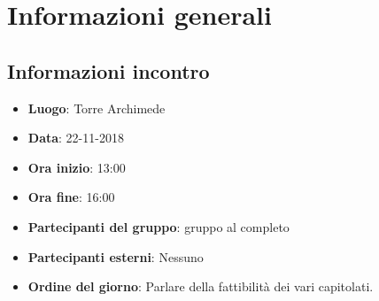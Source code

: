 \newcommand{\documento}{\VI}
\newcommand{\nomedocumentofisico}{VI\_22\_11\_2018.pdf}
\newcommand{\redazione}{\MM \\ & \TG}
\newcommand{\verifica}{\LC}
\newcommand{\approvazione}{\CV}
\newcommand{\versione}{1.0.0}
\newcommand{\uso}{Interno}
\newcommand{\destinateTo}{\TV, \\ & \RC, \\ & \gruppo}
\newcommand{\datacreazione}{25 novembre 2018}
\newcommand{\datamodifica}{26 novembre 2018}
\newcommand{\stato}{Approvato}

\def\TABELLE{false}	%
\def\FIGURE{false} 	%






    

    
    
	
    
    \section{Informazioni generali}
		\subsection{Informazioni incontro}
			\begin{itemize}
				\item { \textbf{Luogo}:  Torre Archimede}
				\item { \textbf{Data}: 22-11-2018}
				\item { \textbf{Ora inizio}: 13:00}
				\item { \textbf{Ora fine}: 16:00}
				\item { \textbf{Partecipanti del gruppo}: gruppo al completo}
				\item { \textbf{Partecipanti esterni}: Nessuno}
				\item { \textbf{Ordine del giorno}: Parlare della fattibilità dei vari capitolati.}
			\end{itemize}


